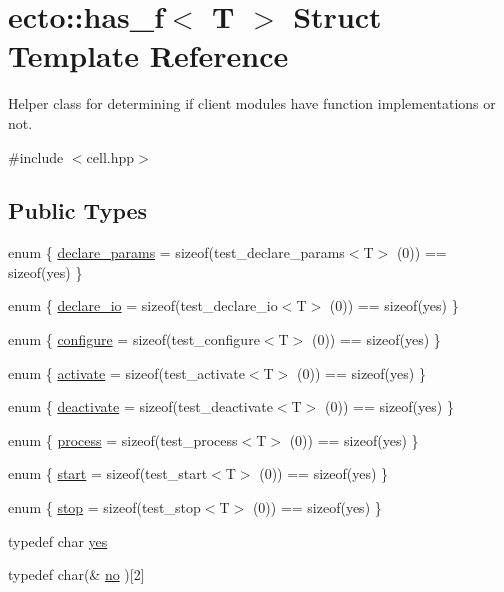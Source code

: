 \hypertarget{structecto_1_1has__f}{\section{ecto\-:\-:has\-\_\-f$<$ T $>$ Struct Template Reference}
\label{structecto_1_1has__f}
}


Helper class for determining if client modules have function implementations or not.  




{\ttfamily \#include $<$cell.\-hpp$>$}

\subsection*{Public Types}
\begin{DoxyCompactItemize}
\item 
enum \{ \hyperlink{structecto_1_1has__f_a37dd9c69c6cfed2ac70c2529d493d410a41824f56b5af096de7e6ee2ccbe9943b}{declare\-\_\-params} = sizeof(test\-\_\-declare\-\_\-params$<$T$>$ (0)) == sizeof(yes)
 \}
\item 
enum \{ \hyperlink{structecto_1_1has__f_abc0a1a04163d85af95636c6213729909ac01ab4ed00f005d55b0813ccb49166f2}{declare\-\_\-io} = sizeof(test\-\_\-declare\-\_\-io$<$T$>$ (0)) == sizeof(yes)
 \}
\item 
enum \{ \hyperlink{structecto_1_1has__f_a173737354c871f8785a6bbe7640bda1da1bc6475abb988c1b998c700d66894960}{configure} = sizeof(test\-\_\-configure$<$T$>$ (0)) == sizeof(yes)
 \}
\item 
enum \{ \hyperlink{structecto_1_1has__f_a8f077b20e8dd579e1a427ac6c80c3d3fa848797161f1dda4f3676f4e2271ebe40}{activate} = sizeof(test\-\_\-activate$<$T$>$ (0)) == sizeof(yes)
 \}
\item 
enum \{ \hyperlink{structecto_1_1has__f_afa9dc8feb074d51ee4600f20447b2724a0f0eba1c7cf0a59268313a95842a7b42}{deactivate} = sizeof(test\-\_\-deactivate$<$T$>$ (0)) == sizeof(yes)
 \}
\item 
enum \{ \hyperlink{structecto_1_1has__f_a575b2f80b107061801e4c2ebd36bd2fcaa6d57b41a7edff0b538fbfddd6e1bf0e}{process} = sizeof(test\-\_\-process$<$T$>$ (0)) == sizeof(yes)
 \}
\item 
enum \{ \hyperlink{structecto_1_1has__f_a2f5a531214c34e93b8efd059afed9348a210df924551c3e6407abe7c1f12b85d0}{start} = sizeof(test\-\_\-start$<$T$>$ (0)) == sizeof(yes)
 \}
\item 
enum \{ \hyperlink{structecto_1_1has__f_af1ab6e8ed499c6c3b404cd7aeda85c87a6db3f78bcdda21cf158666ed1f9dfead}{stop} = sizeof(test\-\_\-stop$<$T$>$ (0)) == sizeof(yes)
 \}
\item 
typedef char \hyperlink{structecto_1_1has__f_a3fb902f1eed02919195aff1a6b28eb76}{yes}
\item 
typedef char(\& \hyperlink{structecto_1_1has__f_ae0c6da775cf20caed616e24681af2807}{no} )\mbox{[}2\mbox{]}
\end{DoxyCompactItemize}
